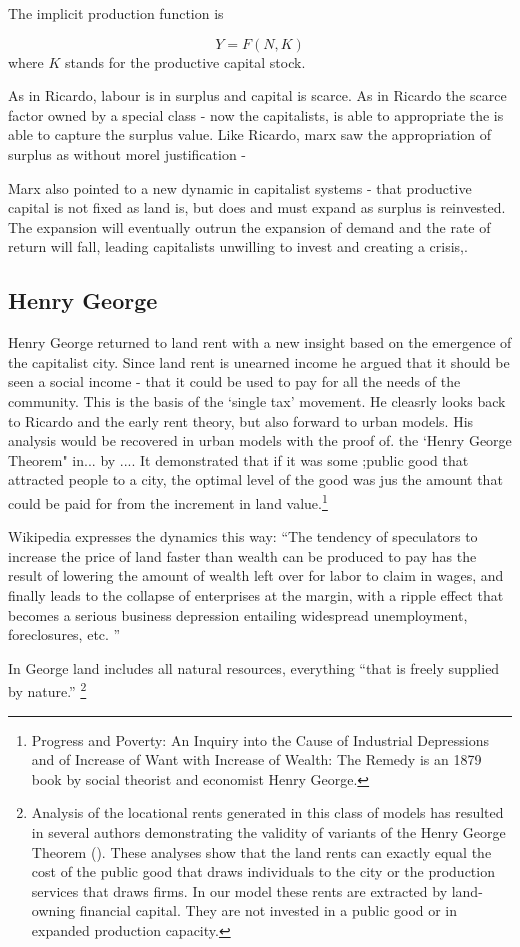  
The implicit production function is

\[Y=F(N, K)\]
where $K$ stands for the productive capital stock. 

As in Ricardo, labour is in surplus and capital is scarce. As in Ricardo the scarce factor owned by a special class - now the capitalists, is able to appropriate the is able to capture the surplus value. Like Ricardo,  marx saw the appropriation of surplus as without morel justification - 


Marx also pointed to a new dynamic in capitalist systems - that productive capital is not fixed as land is, but does and must expand as surplus is reinvested. The expansion will eventually outrun the expansion of demand and the rate of return will fall, leading capitalists unwilling to invest and creating a crisis,.


 
\subsection{Henry George} 
  Henry George returned to land rent with a new insight based on the emergence of the capitalist city. Since land rent is unearned income he argued that it should be seen a social income - that it could be used to pay for all the needs of the community. This is the basis of the `single tax' movement. He cleasrly looks back to Ricardo and the early rent theory, but also forward to urban models. His analysis would be recovered in urban models with the proof of. the `Henry George Theorem" in... by .... It demonstrated that if it was some ;public good that attracted people to a city, the optimal level of the good was jus the amount that could be paid for from the increment in land value.\footnote{Progress and Poverty: An Inquiry into the Cause of Industrial Depressions and of Increase of Want with Increase of Wealth: The Remedy is an 1879 book by social theorist and economist Henry George.}
  
  Wikipedia expresses the dynamics this way: ``The tendency of speculators to increase the price of land faster than wealth can be produced to pay has the result of lowering the amount of wealth left over for labor to claim in wages, and finally leads to the collapse of enterprises at the margin, with a ripple effect that becomes a serious business depression entailing widespread unemployment, foreclosures, etc. ''
  
  In George land includes all natural resources, everything ``that is freely supplied by nature.''  
  \footnote{Analysis of the locational rents generated in this class of models has resulted in several authors demonstrating the validity of variants of the Henry George Theorem (\cite{Arnott-Stiglitz79, Arnott04, BehrensKanemoto14, JohnM.Hartwick1980THGR}). These analyses  show that the land rents can exactly equal the cost of the public good that draws individuals to the city or the production services that draws firms. In our model these rents are extracted by land-owning financial capital. They are not invested in a public good or in expanded production capacity.}
  
